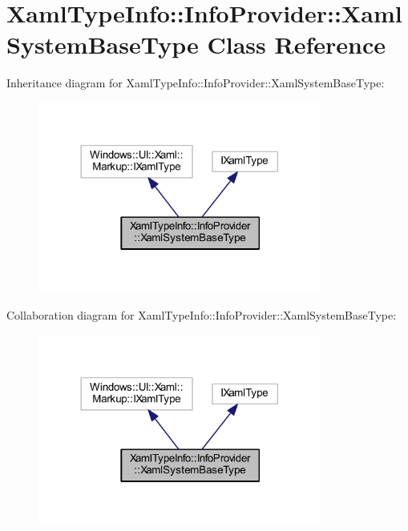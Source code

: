 \hypertarget{class_xaml_type_info_1_1_info_provider_1_1_xaml_system_base_type}{}\section{Xaml\+Type\+Info\+:\+:Info\+Provider\+:\+:Xaml\+System\+Base\+Type Class Reference}
\label{class_xaml_type_info_1_1_info_provider_1_1_xaml_system_base_type}


Inheritance diagram for Xaml\+Type\+Info\+:\+:Info\+Provider\+:\+:Xaml\+System\+Base\+Type\+:\nopagebreak
\begin{figure}[H]
\begin{center}
\leavevmode
\includegraphics[width=264pt]{class_xaml_type_info_1_1_info_provider_1_1_xaml_system_base_type__inherit__graph}
\end{center}
\end{figure}


Collaboration diagram for Xaml\+Type\+Info\+:\+:Info\+Provider\+:\+:Xaml\+System\+Base\+Type\+:\nopagebreak
\begin{figure}[H]
\begin{center}
\leavevmode
\includegraphics[width=264pt]{class_xaml_type_info_1_1_info_provider_1_1_xaml_system_base_type__coll__graph}
\end{center}
\end{figure}
